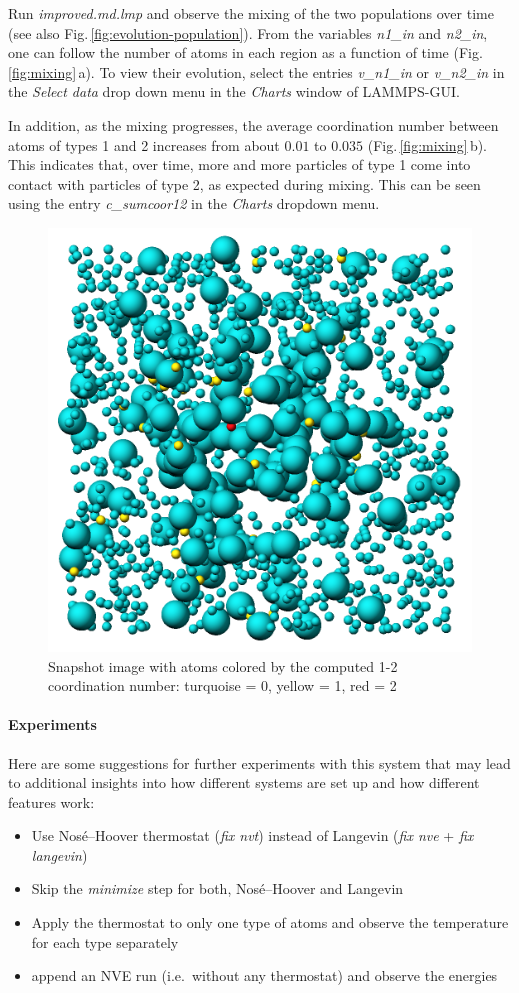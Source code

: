 \documentclass[9pt,tutorial]{livecoms}
\begin{document}
Run \textit{improved.md.lmp} and observe the mixing of the two populations
over time (see also Fig.\,\ref{fig:evolution-population}).  From the
variables \textit{n1\_in} and \textit{n2\_in}, one can follow the number
of atoms in each region as a function of time
(Fig.\,\ref{fig:mixing}\,a).  To view their evolution, select the entries
\textit{v\_n1\_in} or \textit{v\_n2\_in} in the \textit{Select data} drop
down menu in the \textit{Charts} window of LAMMPS-GUI.

In addition, as the mixing progresses, the average coordination number
between atoms of types 1 and 2 increases from about $0.01$ to $0.035$
(Fig.\,\ref{fig:mixing}\,b).  This indicates that, over time, more and
more particles of type 1 come into contact with particles of type 2, as
expected during mixing.  This can be seen using the entry
\textit{c\_sumcoor12} in the \textit{Charts} dropdown menu.

\begin{figure}
\centering
\includegraphics[width=0.55\linewidth]{LJ-coords}
\caption{Snapshot image with atoms colored by the computed 1-2 coordination
  number: turquoise = 0, yellow = 1, red = 2}
\label{fig:coords-viz}
\end{figure}

\paragraph{Experiments}

Here are some suggestions for further experiments with this system that
may lead to additional insights into how different systems are set up
and how different features work:
\begin{itemize}
\item Use Nos\'e--Hoover thermostat (\textit{fix nvt}) instead of Langevin
  (\textit{fix nve} + \textit{fix langevin})
\item Skip the \textit{minimize} step for both, Nos\'e--Hoover and Langevin
\item Apply the thermostat to only one type of atoms and observe the
  temperature for each type separately
\item append an NVE run (i.e.~without any thermostat) and observe the energies
\end{itemize}
\end{document}

